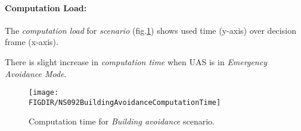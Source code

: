 \paragraph{Computation Load:} The \emph{computation load} for \emph{scenario} (fig.\ref{fig:buildingAvoidanceComputationTime}) shows used time (y-axis) over decision frame (x-axis).

There is slight increase in \emph{computation time} when UAS is in \emph{Emergency Avoidance Mode}.

\begin{figure}[H]
    \centering
    \texttt{[image: \\FIGDIR/NS092BuildingAvoidanceComputationTime]} 
    \caption{Computation time for \emph{Building avoidance} scenario.}
    \label{fig:buildingAvoidanceComputationTime}
\end{figure}
  


